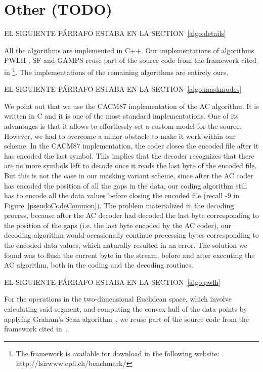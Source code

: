 
\clearpage

\section{Other (TODO)}
\label{algo:other}


EL SIGUIENTE PÁRRAFO ESTABA EN LA SECTION~\ref{algo:details}


All the algorithms are implemented in C++. Our implementations of algorithms PWLH \cite{coder:pwlh}, SF \cite{coder:sf} and GAMPS \cite{coder:gamps} reuse part of the source code from the framework cited in \cite{AnEva2013}\footnote{The framework is available for download in the following website: http://lsirwww.epfl.ch/benchmark/}. The implementations of the remaining algorithms \cite{coder:pca, coder:apca, coder:ca, coder:fr} are entirely ours. 


\vspace{+15pt}
EL SIGUIENTE PÁRRAFO ESTABA EN LA SECTION~\ref{algo:maskmodes}


We point out that we use the CACM87 implementation \cite{arcodingcomp, ac1} of the AC algorithm. It is written in C and it is one of the most standard implementations. One of its advantages is that it allows to effortlessly set a custom model for the source. However, we had to overcome a minor obstacle to make it work within our scheme. In the CACM87 implementation, the coder closes the encoded file after it has encoded the last symbol. This implies that the decoder recognizes that there are no more symbols left to decode once it reads the last byte of the encoded file. But this is not the case in our masking variant scheme, since after the AC coder has encoded the position of all the gaps in the data, our coding algorithm still has to encode all the data values before closing the encoded file (recall -9 in Figure~\ref{pseudoCodeCommon}). The problem materialized in the decoding process, because after the AC decoder had decoded the last byte corresponding to the position of the gaps (i.e. the last byte encoded by the AC coder), our decoding algorithm would occasionally continue processing bytes corresponding to the encoded data values, which naturally resulted in an error. The solution we found was to flush the current byte in the stream, before and after executing the AC algorithm, both in the coding and the decoding routines.


\vspace{+15pt}
EL SIGUIENTE PÁRRAFO ESTABA EN LA SECTION~\ref{algo:pwlh}


For the operations in the two-dimensional Euclidean space, which involve calculating said segment, and computing the convex hull of the data points by applying Graham's Scan algorithm~\cite{GrahamAlgo}, we reuse part of the source code from the framework cited in~\cite{AnEva2013}.
